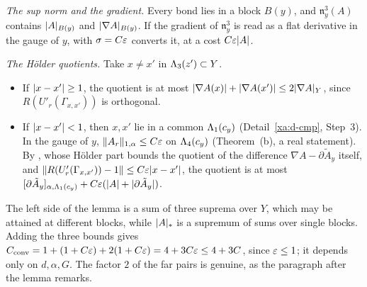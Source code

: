 \begin{detail}\label{xa:d-conv}
\emph{The sup norm and the gradient.} Every bond lies in a block $B(y)$, and $\mathfrak n^3_y(A)$ contains $\lvert A\rvert_{B(y)}$ and $\lvert\nabla A\rvert_{B(y)}$. If the gradient of $\mathfrak n^3_y$ is read as a flat derivative in the gauge of $y$,  with $\sigma=C\varepsilon$ converts it, at a cost $C\varepsilon\lvert A\rvert$.

\emph{The H\"older quotients.} Take $x\ne x'$ in $\Lambda_3(z')\subset Y$.
\begin{itemize}
\item If $\lvert x-x'\rvert\ge1$, the quotient is at most $\lvert\nabla A(x)\rvert+\lvert\nabla A(x')\rvert\le2\lvert\nabla A\rvert_Y$, since $R(U'_r(\Gamma_{x,x'}))$ is orthogonal.
\item If $\lvert x-x'\rvert<1$, then $x,x'$ lie in a common $\Lambda_1(c_y)$ (Detail~\ref{xa:d-cmp}, Step~3). In the gauge of $y$, $\lVert A_r\rVert_{1,\alpha}\le C\varepsilon$ on $\Lambda_4(c_y)$ (Theorem~(b), a real statement). By , whose H\"older part bounds the quotient of the difference $\nabla A-\partial\tilde A_y$ itself, and $\lVert R(U'_r(\Gamma_{x,x'}))-1\rVert\le C\varepsilon\lvert x-x'\rvert$, the quotient is at most $[\partial\tilde A_y]_{\alpha,\Lambda_1(c_y)}+C\varepsilon(\lvert A\rvert+\lvert\partial\tilde A_y\rvert)$.
\end{itemize}
The left side of the lemma is a sum of three suprema over $Y$, which may be attained at different blocks, while $\lvert A\rvert_*$ is a supremum of sums over single blocks. Adding the three bounds gives $C_{\rm conv}=1+(1+C\varepsilon)+2(1+C\varepsilon)=4+3C\varepsilon\le4+3C$, since $\varepsilon\le1$; it depends only on $d,\alpha,G$. The factor $2$ of the far pairs is genuine, as the paragraph after the lemma remarks.
\end{detail}

